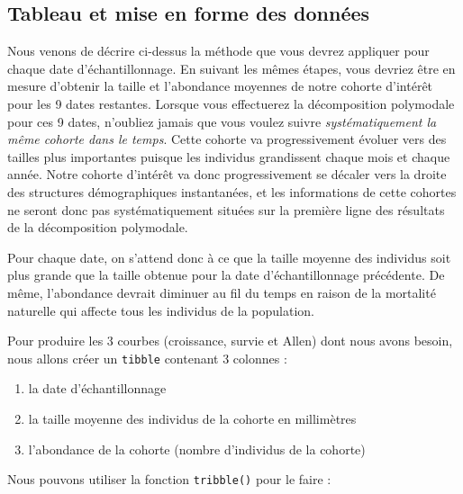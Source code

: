 \documentclass[
  french,
  a4paper,
  DIV=11,
  numbers=noendperiod,
  oneside]{scrreprt}
\newenvironment{Shaded}{}{}
\newcommand{\DecValTok}[1]{\textcolor[rgb]{0.00,0.36,0.77}{#1}}
\newcommand{\FunctionTok}[1]{\textcolor[rgb]{0.44,0.26,0.76}{#1}}
\newcommand{\NormalTok}[1]{\textcolor[rgb]{0.14,0.16,0.18}{#1}}
\newcommand{\OtherTok}[1]{\textcolor[rgb]{0.44,0.26,0.76}{#1}}
\newcommand{\SpecialCharTok}[1]{\textcolor[rgb]{0.00,0.36,0.77}{#1}}
\newcommand{\StringTok}[1]{\textcolor[rgb]{0.01,0.18,0.38}{#1}}
\providecommand{\tightlist}{%
  \setlength{\itemsep}{0pt}\setlength{\parskip}{0pt}}
\begin{document}
\begin{tcolorbox}
\section{Tableau et mise en forme des
données}\label{tableau-et-mise-en-forme-des-donnuxe9es}

Nous venons de décrire ci-dessus la méthode que vous devrez appliquer
pour chaque date d'échantillonnage. En suivant les mêmes étapes, vous
devriez être en mesure d'obtenir la taille et l'abondance moyennes de
notre cohorte d'intérêt pour les 9 dates restantes. Lorsque vous
effectuerez la décomposition polymodale pour ces 9 dates, n'oubliez
jamais que vous voulez suivre \emph{systématiquement la même cohorte
dans le temps}. Cette cohorte va progressivement évoluer vers des
tailles plus importantes puisque les individus grandissent chaque mois
et chaque année. Notre cohorte d'intérêt va donc progressivement se
décaler vers la droite des structures démographiques instantanées, et
les informations de cette cohortes ne seront donc pas systématiquement
situées sur la première ligne des résultats de la décomposition
polymodale.

Pour chaque date, on s'attend donc à ce que la taille moyenne des
individus soit plus grande que la taille obtenue pour la date
d'échantillonnage précédente. De même, l'abondance devrait diminuer au
fil du temps en raison de la mortalité naturelle qui affecte tous les
individus de la population.

Pour produire les 3 courbes (croissance, survie et Allen) dont nous
avons besoin, nous allons créer un \texttt{tibble} contenant 3 colonnes
:

\begin{enumerate}
\def\labelenumi{\arabic{enumi}.}
\tightlist
\item
  la date d'échantillonnage
\item
  la taille moyenne des individus de la cohorte en millimètres
\item
  l'abondance de la cohorte (nombre d'individus de la cohorte)
\end{enumerate}

Nous pouvons utiliser la fonction \texttt{tribble()} pour le faire :

\begin{figure}

\begin{Shaded}
\end{Shaded}


\end{figure}
\end{tcolorbox}
\end{document}
